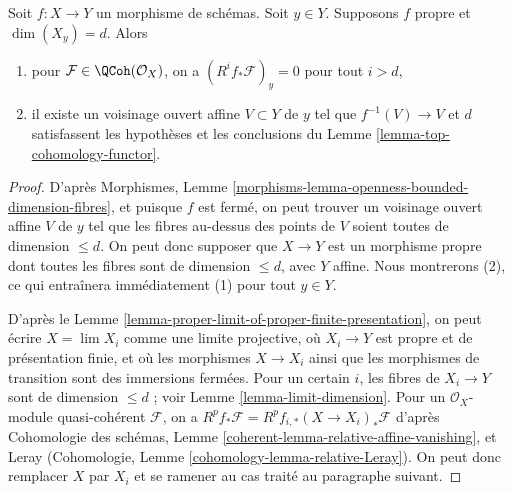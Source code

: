 \begin{lemma}
\label{lemma-higher-direct-images-zero-above-dimension-fibre}
Soit $f : X \to Y$ un morphisme de schémas. Soit $y \in Y$.
Supposons $f$ propre et $\dim(X_y) = d$.
Alors
\begin{enumerate}
\item pour $\mathcal{F} \in \QCoh(\mathcal{O}_X)$,
on a $(R^if_*\mathcal{F})_y = 0$ pour tout $i > d$,
\item il existe un voisinage ouvert affine $V \subset Y$
de $y$ tel que $f^{-1}(V) \to V$ et $d$ satisfassent les
hypothèses et les conclusions du Lemme \ref{lemma-top-cohomology-functor}.
\end{enumerate}
\end{lemma}

\begin{proof}
D'après Morphismes, Lemme
\ref{morphisms-lemma-openness-bounded-dimension-fibres},
et puisque $f$ est fermé, on peut trouver un voisinage ouvert affine
$V$ de $y$ tel que les fibres au-dessus des points de $V$ soient toutes de dimension
$\leq d$. On peut donc supposer que $X \to Y$ est un morphisme propre dont
toutes les fibres sont de dimension $\leq d$, avec $Y$ affine.
Nous montrerons (2), ce qui entraînera immédiatement (1)
pour tout $y \in Y$.

\medskip\noindent
D'après le Lemme \ref{lemma-proper-limit-of-proper-finite-presentation},
on peut écrire $X = \lim X_i$ comme une limite projective, où $X_i \to Y$ est propre
et de présentation finie, et où les morphismes $X \to X_i$
ainsi que les morphismes de transition sont des immersions fermées.
Pour un certain $i$, les fibres de $X_i \to Y$ sont de dimension $\leq d$ ;
voir Lemme \ref{lemma-limit-dimension}.
Pour un $\mathcal{O}_X$-module quasi-cohérent $\mathcal{F}$, on a
$R^pf_*\mathcal{F} = R^pf_{i, *}(X \to X_i)_*\mathcal{F}$ d'après
Cohomologie des schémas, Lemme \ref{coherent-lemma-relative-affine-vanishing},
et Leray (Cohomologie, Lemme \ref{cohomology-lemma-relative-Leray}).
On peut donc remplacer $X$ par $X_i$ et
se ramener au cas traité au paragraphe suivant.


\end{proof}
